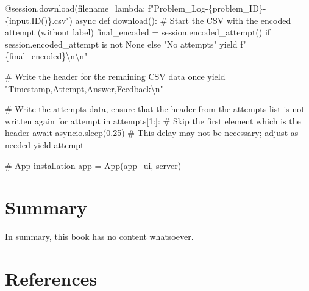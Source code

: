 \documentclass[
  letterpaper,
  DIV=11,
  numbers=noendperiod]{scrreprt}
\newenvironment{Shaded}{\begin{snugshade}}{\end{snugshade}}
\newcommand{\NormalTok}[1]{\textcolor[rgb]{0.00,0.23,0.31}{#1}}
\newlength{\cslhangindent}
\newenvironment{CSLReferences}[2] %
 {\begin{list}{}{%
  \setlength{\itemindent}{0pt}
  \setlength{\leftmargin}{0pt}
  \setlength{\parsep}{0pt}
  \ifodd #1
   \setlength{\leftmargin}{\cslhangindent}
   \setlength{\itemindent}{-1\cslhangindent}
  \fi
  \setlength{\itemsep}{#2\baselineskip}}}
 {\end{list}}
\begin{document}
\begin{Shaded}
\begin{Highlighting}[]
\NormalTok{    @session.download(filename=lambda: f"Problem\_Log{-}\{problem\_ID\}{-}\{input.ID()\}.csv")}
\NormalTok{    async def download():}
\NormalTok{        \# Start the CSV with the encoded attempt (without label)}
\NormalTok{        final\_encoded = session.encoded\_attempt() if session.encoded\_attempt is not None else "No attempts"}
\NormalTok{        yield f"\{final\_encoded\}\textbackslash{}n\textbackslash{}n"}
        
\NormalTok{        \# Write the header for the remaining CSV data once}
\NormalTok{        yield "Timestamp,Attempt,Answer,Feedback\textbackslash{}n"}
        
\NormalTok{        \# Write the attempts data, ensure that the header from the attempts list is not written again}
\NormalTok{        for attempt in attempts[1:]:  \# Skip the first element which is the header}
\NormalTok{            await asyncio.sleep(0.25)  \# This delay may not be necessary; adjust as needed}
\NormalTok{            yield attempt}


\NormalTok{\# App installation}
\NormalTok{app = App(app\_ui, server)}
\end{Highlighting}
\end{Shaded}


\chapter{Summary}\label{summary}

In summary, this book has no content whatsoever.


\chapter*{References}\label{references}


\label{refs}
\begin{CSLReferences}{0}{1}
\end{CSLReferences}
\end{document}
